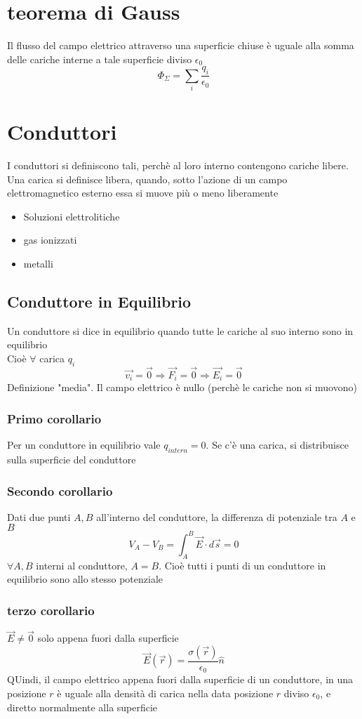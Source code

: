 \documentclass[a4paper]{report}
\begin{document}
  \section{teorema di Gauss}
  Il flusso del campo elettrico attraverso una superficie chiuse è uguale alla somma delle cariche interne a tale superficie diviso $\epsilon_0$
  \[ \Phi_{\Sigma} = \sum_i \frac{q_i}{\epsilon_0} \]

  \section{Conduttori}
  I conduttori si definiscono tali, perchè al loro interno contengono cariche libere. Una carica si definisce libera, quando, sotto l'azione di un campo elettromagnetico esterno essa si muove più o meno liberamente
  \begin{itemize}
    \item Soluzioni elettrolitiche
      \item gas ionizzati
    \item metalli
  \end{itemize}

  \subsection{Conduttore in Equilibrio}
  Un conduttore si dice in equilibrio quando tutte le cariche al suo interno sono in equilibrio\\
  Cioè $\forall$ carica $q_i$
  \[\vec{v_i} = \vec{0} \Rightarrow \vec{F_i} = \vec{0} \Rightarrow \vec{E_i} = \vec{0}\]
  Definizione "media". Il campo elettrico è nullo (perchè le cariche non si muovono)\\

  \subsubsection{Primo corollario}
  Per un conduttore in equilibrio vale $q_{intern} =0$. Se c'è una carica, si distribuisce sulla superficie del conduttore
  \subsubsection{Secondo corollario}
  Dati due punti $A, B$ all'interno del conduttore, la differenza di potenziale tra $A$ e $B$
  \[V_A - V_B = \int_A^B \vec{E}\cdot d\vec{s}=0 \]
  $\forall A,B$ interni al conduttore, $A=B$. Cioè tutti i punti di un conduttore in equilibrio sono allo stesso potenziale
  \subsubsection{terzo corollario}
  \( \vec{E} \neq \vec{0} \) solo appena fuori dalla superficie
  \[ \vec{E}(\vec{r}) = \frac{\sigma(\vec{r})}{\epsilon_0} \hat{n} \]
  QUindi, il campo elettrico appena fuori dalla superficie di un conduttore, in una posizione $r$ è uguale alla densità di carica nella data posizione $r$ diviso $\epsilon_0$, e diretto normalmente alla superficie
\end{document}
